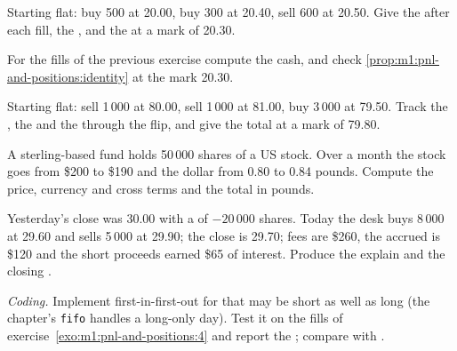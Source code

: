 \begin{exercise}[$\star$]\label{exo:m1:pnl-and-positions:2}
Starting flat: buy 500 at 20.00, buy 300 at 20.40, sell 600 at 20.50. Give
the  after each fill, the , and the 
at a mark of 20.30.
\end{exercise}

\begin{exercise}[$\star$]\label{exo:m1:pnl-and-positions:3}
For the fills of the previous exercise compute the cash, and check
\cref{prop:m1:pnl-and-positions:identity} at the mark 20.30.
\end{exercise}

\begin{exercise}[$\star\star$]\label{exo:m1:pnl-and-positions:4}
Starting flat: sell 1\,000 at 80.00, sell 1\,000 at 81.00, buy 3\,000 at
79.50. Track the , the  and the  through the
flip, and give the total at a mark of 79.80.
\end{exercise}

\begin{exercise}[$\star\star$]\label{exo:m1:pnl-and-positions:5}
A sterling-based fund holds 50\,000 shares of a US stock. Over a month the
stock goes from \$200 to \$190 and the dollar from 0.80 to 0.84 pounds.
Compute the price, currency and cross terms and the total in pounds.
\end{exercise}

\begin{exercise}[$\star\star$]\label{exo:m1:pnl-and-positions:6}
Yesterday's close was 30.00 with a  of $-20\,000$ shares. Today the
desk buys 8\,000 at 29.60 and sells 5\,000 at 29.90; the close is 29.70; fees
are \$260, the  accrued is \$120 and the short proceeds earned
\$65 of interest. Produce the explain and the closing .
\end{exercise}

\begin{exercise}[$\star\star\star$]\label{exo:m1:pnl-and-positions:7}
\emph{Coding.} Implement first-in-first-out for  that may be short
as well as long (the chapter's \texttt{fifo} handles a long-only day). Test
it on the fills of exercise~\ref{exo:m1:pnl-and-positions:4} and report the
; compare with .
\end{exercise}

